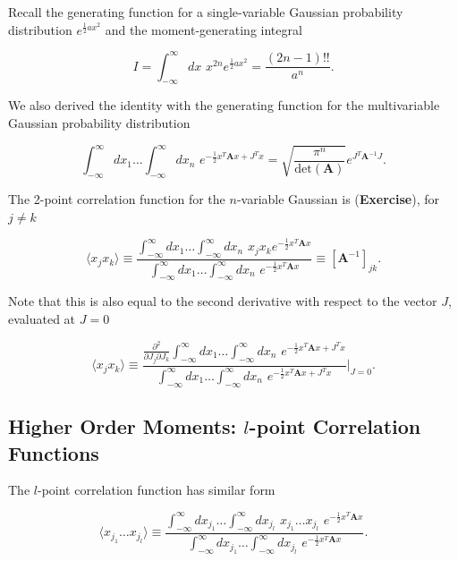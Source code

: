 
\noindent Recall the generating function for a single-variable Gaussian probability distribution $e^{\frac{1}{2} a x^2}$ and the moment-generating integral

\begin{equation}
I = \int_{-\infty}^\infty dx \,\, x^{2n} e^{\frac{1}{2} a x^2} = \frac{(2n-1)!!}{a^n}.
\end{equation}

\noindent We also derived the identity with the generating function for the multivariable Gaussian probability distribution

\begin{equation}
\int_{-\infty}^\infty dx_1 \dots \int_{-\infty}^\infty dx_n \,\, e^{-\frac{1}{2} x^T \textbf{A} x + J^T x} = \sqrt{\frac{\pi^n}{\text{det}(\textbf{A})}} e^{J^T \textbf{A}^{-1} J}.
\end{equation}

\noindent The 2-point correlation function for the $n$-variable Gaussian is (\textbf{Exercise}), for $j \ne k$

\begin{equation}
\langle x_j x_k \rangle \equiv \frac{\int_{-\infty}^\infty dx_1 \dots \int_{-\infty}^\infty dx_n \,\, x_j x_k e^{-\frac{1}{2} x^T \textbf{A} x}}{\int_{-\infty}^\infty dx_1 \dots \int_{-\infty}^\infty dx_n \,\, e^{-\frac{1}{2} x^T \textbf{A} x}} \equiv[\textbf{A}^{-1}]_{jk}.
\end{equation}

\noindent Note that this is also equal to the second derivative with respect to the vector $J$, evaluated at $J=0$

\begin{equation}
\langle x_j x_k \rangle \equiv \frac{\frac{\partial^2}{\partial J_j \partial J_k}\int_{-\infty}^\infty dx_1 \dots \int_{-\infty}^\infty dx_n \,\, e^{-\frac{1}{2} x^T \textbf{A} x + J^T x} }{\int_{-\infty}^\infty dx_1 \dots \int_{-\infty}^\infty dx_n \,\, e^{-\frac{1}{2} x^T \textbf{A} x + J^T x}} \Big|_{J=0}.
\end{equation}

\subsection*{Higher Order Moments: $l$-point Correlation Functions}

\noindent The $l$-point correlation function has similar form

\begin{equation}
\langle x_{j_1} \dots x_{j_l} \rangle \equiv \frac{\int_{-\infty}^\infty dx_{j_1} \dots \int_{-\infty}^\infty dx_{j_l} \,\, x_{j_1} \dots x_{j_l} \,\, e^{-\frac{1}{2} x^T \textbf{A} x}}{\int_{-\infty}^\infty dx_{j_1} \dots \int_{-\infty}^\infty dx_{j_l} \,\, e^{-\frac{1}{2} x^T \textbf{A} x}}.
\end{equation}

